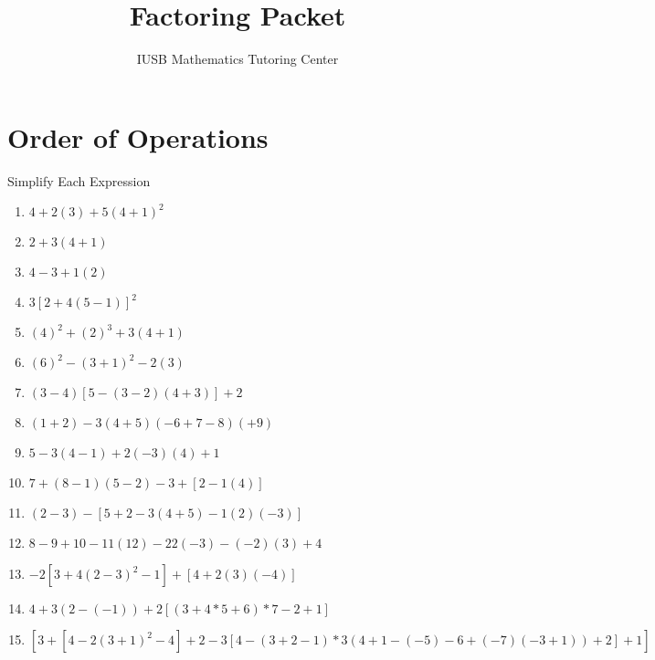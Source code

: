 \documentclass{article}
\title{Factoring Packet}
\date{\mydate}
\author{IUSB Mathematics Tutoring Center}
\begin{document}
\maketitle
\newpage
{}
\tableofcontents

\newpage
\section{Order of Operations}
Simplify Each Expression\\
\begin{enumerate}
\item $4+2(3)+5(4+1)^{2}$
\item $2+3(4+1)$
\item $4-3+1(2)$
\item $3[2+4(5-1)]^{2}$
\item $(4)^{2}+(2)^{3}+3(4+1)$
\item $(6)^{2}-(3+1)^{2}-2(3)$
\item $(3-4)[5-(3-2)(4+3)]+2$
\item $(1+2)-3(4+5)(-6+7-8)(+9)$
\item $5-3(4-1)+2(-3)(4)+1$
\item $7+(8-1)(5-2)-3+[2-1(4)]$
\item $(2-3)-[5+2-3(4+5)-1(2)(-3)]$
\item $8-9+10-11(12)-22(-3)-(-2)(3)+4$
\item $-2[3+4(2-3)^{2}-1]+[4+2(3)(-4)]$
\item $4+3(2-(-1))+2[(3+4*5+6)*7-2+1]$
\item $[3+[4-2(3+1)^{2}-4]+2-3[4-(3+2-1)*3(4+1-(-5)-6+(-7)(-3+1))+2]+1]$
\end{enumerate}

\newpage
\end{document}
